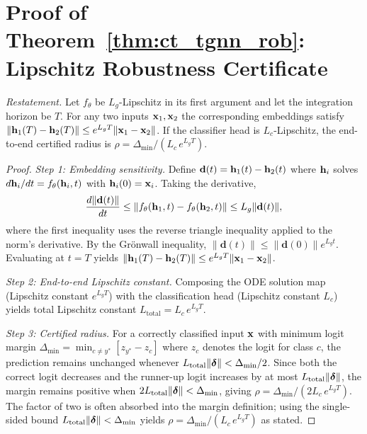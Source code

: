 \section{Proof of Theorem~\ref{thm:ct_tgnn_rob}: Lipschitz Robustness Certificate}
\label{app:proof_ct_rob}

\noindent\textit{Restatement.} Let $f_\theta$ be $L_g$-Lipschitz in its first argument and let the integration horizon be $T$. For any two inputs $\mathbf{x}_1,\mathbf{x}_2$ the corresponding embeddings satisfy $\|\mathbf{h}_1(T)-\mathbf{h}_2(T)\|\le e^{L_g T}\|\mathbf{x}_1-\mathbf{x}_2\|$. If the classifier head is $L_c$-Lipschitz, the end-to-end certified radius is $\rho = \Delta_{\min}/(L_c\,e^{L_g T})$.

\begin{proof}
\textit{Step 1: Embedding sensitivity.} Define $\mathbf{d}(t) = \mathbf{h}_1(t)-\mathbf{h}_2(t)$ where $\mathbf{h}_i$ solves $d\mathbf{h}_i/dt = f_\theta(\mathbf{h}_i,t)$ with $\mathbf{h}_i(0)=\mathbf{x}_i$. Taking the derivative,
\begin{equation}
\frac{d\|\mathbf{d}(t)\|}{dt}
\le \|f_\theta(\mathbf{h}_1,t)-f_\theta(\mathbf{h}_2,t)\|
\le L_g\|\mathbf{d}(t)\|,
\end{equation}
where the first inequality uses the reverse triangle inequality applied to the norm's derivative. By the Gr\"{o}nwall inequality, $\|\mathbf{d}(t)\|\le\|\mathbf{d}(0)\|e^{L_g t}$. Evaluating at $t=T$ yields $\|\mathbf{h}_1(T)-\mathbf{h}_2(T)\|\le e^{L_g T}\|\mathbf{x}_1-\mathbf{x}_2\|$.

\textit{Step 2: End-to-end Lipschitz constant.} Composing the ODE solution map (Lipschitz constant $e^{L_g T}$) with the classification head (Lipschitz constant $L_c$) yields total Lipschitz constant $L_{\mathrm{total}} = L_c\,e^{L_g T}$.

\textit{Step 3: Certified radius.} For a correctly classified input $\mathbf{x}$ with minimum logit margin $\Delta_{\min}=\min_{c\neq y^*}[z_{y^*}-z_c]$ where $z_c$ denotes the logit for class $c$, the prediction remains unchanged whenever $L_{\mathrm{total}}\|\boldsymbol{\delta}\|<\Delta_{\min}/2$. Since both the correct logit decreases and the runner-up logit increases by at most $L_{\mathrm{total}}\|\boldsymbol{\delta}\|$, the margin remains positive when $2L_{\mathrm{total}}\|\boldsymbol{\delta}\|<\Delta_{\min}$, giving $\rho = \Delta_{\min}/(2L_c\,e^{L_g T})$. The factor of two is often absorbed into the margin definition; using the single-sided bound $L_{\mathrm{total}}\|\boldsymbol{\delta}\|<\Delta_{\min}$ yields $\rho = \Delta_{\min}/(L_c\,e^{L_g T})$ as stated.
\end{proof}


